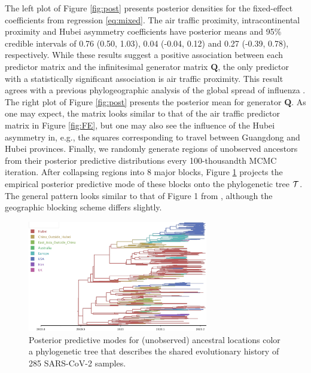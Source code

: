 \documentclass[9pt,twocolumn,twoside]{pnas-new}
\newcommand{\phylogeny}{{\cal T}}
\newcommand{\?}{\textbf{?}}
\newcommand{\QQ}{\mathbf{Q}}
\begin{document}
The left plot of Figure \ref{fig:post} presents posterior densities
for the fixed-effect coefficients from regression \eqref{eq:mixed}.
The air traffic proximity, intracontinental proximity and Hubei
asymmetry coefficients have posterior means and 95\% credible
intervals of 0.76 (0.50, 1.03), 0.04 (-0.04, 0.12) and 0.27 (-0.39,
0.78), respectively. While these results suggest a positive
association between each predictor matrix and the infinitesimal
generator matrix $\QQ$, the only predictor with a statistically
significant association is air traffic proximity.  This result agrees
with a previous phylogeographic analysis of the global spread of
influenza \cite{holbrook2021massive}.  The right plot of Figure
\ref{fig:post} presents the posterior mean for generator $\QQ$.  As
one may expect, the matrix looks similar to that of the air traffic
predictor matrix in Figure \ref{fig:FE}, but one may also see the
influence of the Hubei asymmetry in, e.g., the squares corresponding
to travel between Guangdong and Hubei provinces.  Finally, we randomly
generate regions of unobserved ancestors from their posterior
predictive distributions every 100-thousandth MCMC iteration.
After collapsing regions into 8 major blocks, Figure \ref{fig:tree} projects the empirical posterior predictive mode of these blocks onto the phylogenetic tree $\phylogeny$.  The general pattern looks similar to that of Figure 1 from \cite{lemey2020accommodating}, although the geographic blocking scheme differs slightly.



\begin{figure}[!t]
	\centering
	\includegraphics[width=0.7\textwidth]{summary2.tree.pdf}
	\vspace{-0.5em}
	\caption{Posterior predictive modes for (unobserved) ancestral
          locations color a phylogenetic tree that describes the
          shared evolutionary history of 285 SARS-CoV-2
          samples.}\label{fig:tree}
\end{figure}
\end{document}
